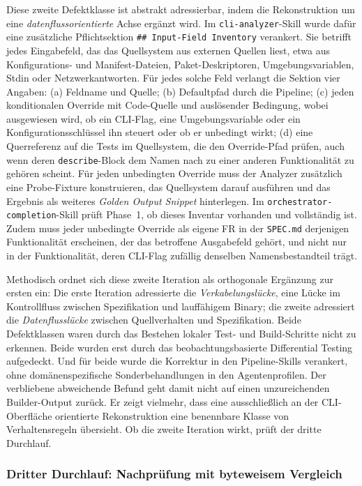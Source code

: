 Diese zweite Defektklasse ist abstrakt adressierbar, indem die Rekonstruktion um eine \emph{datenflussorientierte} Achse ergänzt wird. Im \texttt{cli-analyzer}-Skill wurde dafür eine zusätzliche Pflichtsektion \texttt{\#\# Input-Field Inventory} verankert. Sie betrifft jedes Eingabefeld, das das Quellsystem aus externen Quellen liest, etwa aus Konfigurations- und Manifest-Dateien, Paket-Deskriptoren, Umgebungsvariablen, Stdin oder Netzwerkantworten. Für jedes solche Feld verlangt die Sektion vier Angaben:
(a) Feldname und Quelle;
(b) Defaultpfad durch die Pipeline;
(c) jeden konditionalen Override mit Code-Quelle und auslösender Bedingung, wobei ausgewiesen wird, ob ein CLI-Flag, eine Umgebungsvariable oder ein Konfigurationsschlüssel ihn steuert oder ob er unbedingt wirkt;
(d) eine Querreferenz auf die Tests im Quellsystem, die den Override-Pfad prüfen, auch wenn deren \texttt{describe}-Block dem Namen nach zu einer anderen Funktionalität zu gehören scheint.
Für jeden unbedingten Override muss der Analyzer zusätzlich eine Probe-Fixture konstruieren, das Quellsystem darauf ausführen und das Ergebnis als weiteres \emph{Golden Output Snippet} hinterlegen. Im \texttt{orchestrator-completion}-Skill prüft Phase~1, ob dieses Inventar vorhanden und vollständig ist. Zudem muss jeder unbedingte Override als eigene FR in der \texttt{SPEC.md} derjenigen Funktionalität erscheinen, der das betroffene Ausgabefeld gehört, und nicht nur in der Funktionalität, deren CLI-Flag zufällig denselben Namensbestandteil trägt.

Methodisch ordnet sich diese zweite Iteration als orthogonale Ergänzung zur ersten ein: Die erste Iteration adressierte die \emph{Verkabelungslücke}, eine Lücke im Kontrollfluss zwischen Spezifikation und lauffähigem Binary; die zweite adressiert die \emph{Datenflusslücke} zwischen Quellverhalten und Spezifikation. Beide Defektklassen waren durch das Bestehen lokaler Test- und Build-Schritte nicht zu erkennen. Beide wurden erst durch das beobachtungsbasierte Differential Testing aufgedeckt. Und für beide wurde die Korrektur in den Pipeline-Skills verankert, ohne domänenspezifische Sonderbehandlungen in den Agentenprofilen. Der verbliebene abweichende Befund geht damit nicht auf einen unzureichenden Builder-Output zurück. Er zeigt vielmehr, dass eine ausschließlich an der CLI-Oberfläche orientierte Rekonstruktion eine benennbare Klasse von Verhaltensregeln übersieht. Ob die zweite Iteration wirkt, prüft der dritte Durchlauf.

\subsubsection{Dritter Durchlauf: Nachprüfung mit byteweisem Vergleich} \label{sec:dritter-lauf}

